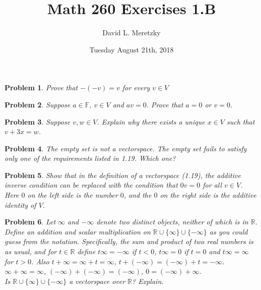 \documentclass{article}
\title{ \vspace{-10ex} %
Math 260 Exercises 1.B 
}
\author{David L. Meretzky
}
\date{%
Tuesday August 21th, 2018
}
\theoremstyle{problemstyle}
\newtheorem{problem}{Problem}
\theoremstyle{problemstyle}
\begin{document}
\maketitle

\begin{problem}
Prove that $-(-v) = v$ for every $v \in V$ 
\end{problem}

\begin{problem}
Suppose $a \in \mathbb{F}$, $v \in V$ and $av = 0$. Prove that $a = 0$ or $v = 0$. 
\end{problem}

\begin{problem}
Suppose $v,w \in V$. Explain why there exists a unique $x \in V$ such that $v + 3x = w$.
\end{problem}

\begin{problem}
The empty set is not a vectorspace. The empty set fails to satisfy only one of the requirements listed in 1.19. Which one?
\end{problem}

\begin{problem}
Show that in the definition of a vectorspace (1.19), the additive inverse condition can be replaced with the condition that $0v = 0$ for all $v \in V$. Here $0$ on the left side is the number $0$, and the $0$ on the right side is the additive identity of $V$. 
\end{problem}

\begin{problem}
Let $\infty$ and $-\infty$ denote two distinct objects, neither of which is in $\mathbb{R}$. Define an addition and scalar multiplication on $\mathbb{R}\cup \{\infty\}\cup \{-\infty\}$ as you could guess from the notation. Specifically, the sum and product of two real numbers is as usual, and for $t \in \mathbb{R}$ define $t\infty
 = -\infty$ if $t < 0$, $t\infty = 0$ if $t = 0$ and $t\infty = \infty$ for $t>0$. Also $t+\infty = \infty +t =  \infty$, $t+(-\infty) = (-\infty) +t =-\infty$. $\infty+\infty =\infty$, $(-\infty)+(-\infty) =(-\infty)$, $0 = (-\infty)+\infty$.\\
Is $\mathbb{R}\cup \{\infty\}\cup \{-\infty\}$ a vectorspace over $\mathbb{R}$? Explain.
 \end{problem}
\end{document}
